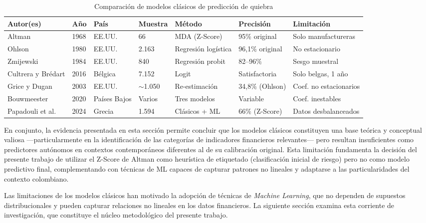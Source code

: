 \documentclass[12pt, letterpaper]{article}
\begin{document}
\begin{table}[htbp]
\centering
\caption{Comparaci\'on de modelos cl\'asicos de predicci\'on de quiebra}
\label{tab:clasicos}
\small
\begin{tabularx}{\textwidth}{L{2.2cm} C{0.8cm} L{1.8cm} C{1.2cm} L{2.5cm} L{2cm} L{3cm}}
\toprule
\textbf{Autor(es)} & \textbf{A\~no} & \textbf{Pa\'is} & \textbf{Muestra} & \textbf{M\'etodo} & \textbf{Precisi\'on} & \textbf{Limitaci\'on} \\
\midrule
Altman & 1968 & EE.UU. & 66 & MDA (Z-Score) & 95\% original & Solo manufactureras \\
Ohlson & 1980 & EE.UU. & 2.163 & Regresi\'on log\'istica & 96,1\% original & No estacionario \\
Zmijewski & 1984 & EE.UU. & 840 & Regresi\'on probit & 82--96\% & Sesgo muestral \\
Cultrera y Br\'edart & 2016 & B\'elgica & 7.152 & Logit & Satisfactoria & Solo belgas, 1 a\~no \\
Grice y Dugan & 2003 & EE.UU. & $\sim$1.050 & Re-estimaci\'on & 34,8\% (Ohlson) & Coef. no estacionarios \\
Bouwmeester & 2020 & Pa\'ises Bajos & Varios & Tres modelos & Variable & Coef. inestables \\
Papadouli et al. & 2024 & Grecia & 1.594 & Cl\'asicos + ML & 66\% (Z-Score) & Datos desbalanceados \\
\bottomrule
\end{tabularx}
\end{table}

En conjunto, la evidencia presentada en esta secci\'on permite concluir que los modelos cl\'asicos constituyen una base te\'orica y conceptual valiosa ---particularmente en la identificaci\'on de las categor\'ias de indicadores financieros relevantes--- pero resultan insuficientes como predictores aut\'onomos en contextos contempor\'aneos diferentes al de su calibraci\'on original. Esta limitaci\'on fundamenta la decisi\'on del presente trabajo de utilizar el Z-Score de Altman como heur\'istica de etiquetado (clasificaci\'on inicial de riesgo) pero no como modelo predictivo final, complementando con t\'ecnicas de ML capaces de capturar patrones no lineales y adaptarse a las particularidades del contexto colombiano.

Las limitaciones de los modelos cl\'asicos han motivado la adopci\'on de t\'ecnicas de \textit{Machine Learning}, que no dependen de supuestos distribucionales y pueden capturar relaciones no lineales en los datos financieros. La siguiente secci\'on examina esta corriente de investigaci\'on, que constituye el n\'ucleo metodol\'ogico del presente trabajo.
\end{document}
